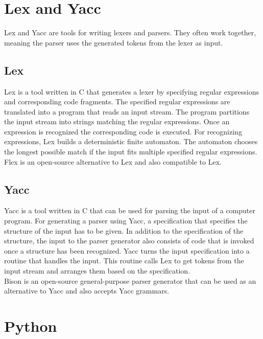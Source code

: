 \section{Lex and Yacc}\label{sec:BackgroundLexYacc}

Lex and Yacc are tools for writing lexers and parsers. They often work together, meaning the parser uses the generated tokens from the lexer as input.

\subsection{Lex}\label{sec:BackgroundLex}

Lex is a tool written in C that generates a lexer by specifying regular expressions and corresponding code fragments. The specified regular expressions are translated into a program that reads an input stream. The program partitions the input stream into strings matching the regular expressions. Once an expression is recognized the corresponding code is executed. For recognizing expressions, Lex builds a deterministic finite automaton. The automaton chooses the longest possible match if the input fits multiple specified regular expressions. \cite{Lex}\\
Flex is an open-source alternative to Lex and also compatible to Lex. \cite{Flex}

\subsection{Yacc}\label{sec:BackgroundYacc}
Yacc is a tool written in C that can be used for parsing the input of a computer program. 
For generating a parser using Yacc, a specification that specifies the structure of the input has to be given. In addition to the specification of the structure, the input to the parser generator also consists of code that is invoked once a structure has been recognized. 
Yacc turns the input specification into a routine that handles the input. This routine calls Lex to get tokens from the input stream and arranges them based on the specification. \cite{Yacc}\\
Bison is an open-source general-purpose parser generator that can be used as an alternative to Yacc and also accepts Yacc grammars. \cite{Bison}

\section{Python}\label{sec:BackgroundPython}

